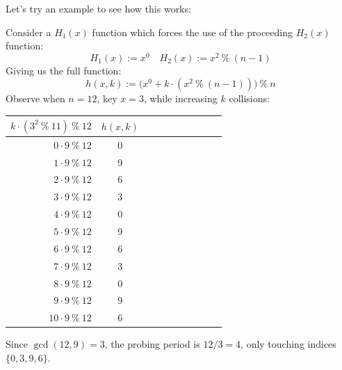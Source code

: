\newpage 
\noindent
Let's try an example to see how this works:

\begin{Example}

    Consider a $H_1(x)$ function which forces the use of the proceeding $H_2(x)$ function:
    \[
        H_1(x) := x^0 \quad H_2(x) := x^2\ \%\ (n-1)
    \]
    \noindent
    Giving us the full function:
    \[
    h(x,k) := \bigl(x^0 + k \cdot \left(x^2\ \%\ (n-1)\right)\bigr)\ \%\ n
    \]
    Observe when $n=12$, key $x=3$, while increasing $k$ collisions:

    \begin{center}
    
 
    \setlength{\tabcolsep}{3pt}
\renewcommand{\arraystretch}{1.1}
\begin{tabular}{r|*{9}{c}}
    \multicolumn{1}{c|}{$
      k \cdot (3^2\ \%\ 11)\ \%\ 12
    $}
      & $h(x,k)$ \\
    \hline
    $0 \cdot 9\ \%\ 12$  & 0 \\
    $1 \cdot 9\ \%\ 12$  & 9   \\
    $2 \cdot 9\ \%\ 12$  & 6   \\
    $3 \cdot 9\ \%\ 12$  & 3   \\
    $4 \cdot 9\ \%\ 12$  & 0   \\
    $5 \cdot 9\ \%\ 12$  & 9   \\
    $6 \cdot 9\ \%\ 12$  & 6   \\
    $7 \cdot 9\ \%\ 12$  & 3   \\
    $8 \cdot 9\ \%\ 12$  & 0   \\
    $9 \cdot 9\ \%\ 12$  & 9   \\
    $10 \cdot 9\ \%\ 12$ & 6   \\
\end{tabular}
     \end{center}
\noindent
Since $\gcd(12, 9) = 3$, the probing period is $12/3 = 4$, only touching indices 
$\{0,3,9,6\}$.

\end{Example}



